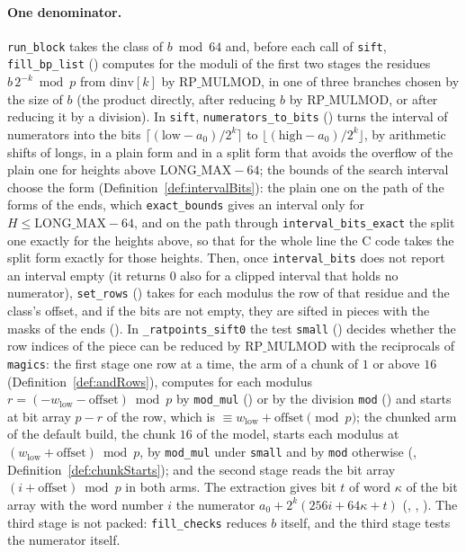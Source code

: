 \paragraph{One denominator.} \verb|run_block| takes the class of $b \bmod 64$ and, before each call
of \verb|sift|, \verb|fill_bp_list| () computes for the moduli of
the first two stages the residues $b\, 2^{-k} \bmod p$ from $\mathrm{dinv}[k]$ by
$\mathrm{RP\_MULMOD}$, in one of three branches chosen by the size of $b$ (the product directly,
after reducing $b$ by $\mathrm{RP\_MULMOD}$, or after reducing it by a division). In \verb|sift|,
\verb|numerators_to_bits| () turns the interval of numerators
into the bits $\lceil(\mathrm{low} - a_0)/2^k\rceil$ to $\lfloor(\mathrm{high} - a_0)/2^k\rfloor$,
by arithmetic shifts of longs, in a plain form and in a split form that avoids the overflow of the
plain one for heights above $\mathrm{LONG\_MAX} - 64$; the bounds of the search interval choose the
form (Definition~\ref{def:intervalBits}): the plain one on the path of the forms of the ends, which
\verb|exact_bounds| gives an interval only for $H \le \mathrm{LONG\_MAX} - 64$, and on the path
through \verb|interval_bits_exact| the split one exactly for the heights above, so that for the
whole line the C code takes the split form exactly for those heights. Then, once
\verb|interval_bits| does not report an interval empty (it returns $0$ also for a clipped interval
that holds no numerator), \verb|set_rows|
() takes for each modulus the row of that residue and the class's
offset, and if the bits are not empty, they are sifted in pieces with the masks of the ends
().
In \verb|_ratpoints_sift0| the test \verb|small| () decides whether the
row indices of the piece can be reduced by $\mathrm{RP\_MULMOD}$ with the reciprocals of
\verb|magics|: the first stage one row at a time, the arm of a chunk of $1$ or above $16$
(Definition~\ref{def:andRows}), computes for each modulus
$r = (-w_{\mathrm{low}} - \mathrm{offset}) \bmod p$ by \verb|mod_mul| ()
or by the division \verb|mod| () and starts at bit array $p - r$ of the
row, which is $\equiv w_{\mathrm{low}} + \mathrm{offset} \pmod p$; the chunked arm of the default
build, the chunk $16$ of the model, starts each modulus at
$(w_{\mathrm{low}} + \mathrm{offset}) \bmod p$, by \verb|mod_mul| under \verb|small| and by
\verb|mod| otherwise (, Definition~\ref{def:chunkStarts}); and the second
stage reads the bit array $(i + \mathrm{offset}) \bmod p$ in both arms. The extraction gives bit $t$
of word $\kappa$ of the bit array with the word number $i$ the numerator
$a_0 + 2^k (256 i + 64 \kappa + t)$ (, ,
). The third stage is not packed: \verb|fill_checks| reduces $b$ itself,
and the third stage tests the numerator itself.

